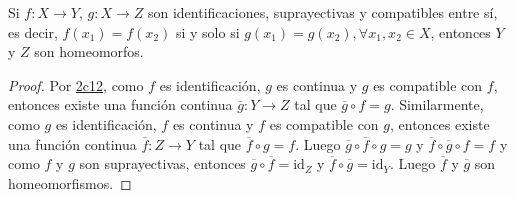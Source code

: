 

\begin{corollary}
Si $f : X \longrightarrow Y$, $g : X \longrightarrow Z$ son identificaciones, suprayectivas y compatibles entre sí, es decir, $f(x_1) = f(x_2)$ si y solo si $g(x_1) = g(x_2), \forall x_1, x_2 \in X$, entonces $Y$ y $Z$ son homeomorfos.
\end{corollary}

\begin{proof}
Por \hyperref[card:2c12]{\textsf{2c12}}, como $f$ es identificación, $g$ es continua y $g$ es compatible con $f$, entonces existe una función continua $\overline{g} : Y \longrightarrow Z$ tal que $\overline{g} \circ f = g$. Similarmente, como $g$ es identificación, $f$ es continua y $f$ es compatible con $g$, entonces existe una función continua $\overline{f} : Z \longrightarrow Y$ tal que $\overline{f} \circ g = f$. Luego $\overline{g} \circ \overline{f} \circ g = g$ y $\overline{f} \circ \overline{g} \circ f = f$ y como $f$ y $g$ son suprayectivas, entonces $\overline{g} \circ \overline{f} = \text{id}_{Z}$ y $\overline{f} \circ \overline{g} =  \text{id}_{Y}$. Luego $\overline{f}$ y $\overline{g}$ son homeomorfismos.
\end{proof}
